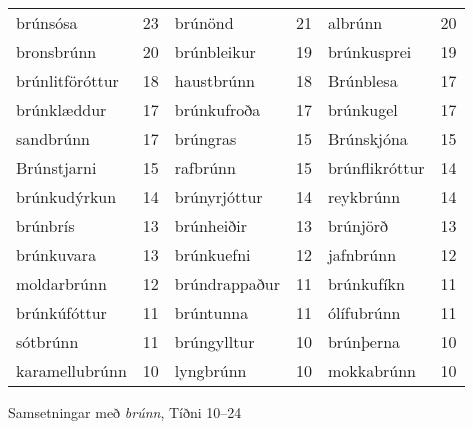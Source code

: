 \documentclass[../samsetningasafn.tex]{subfiles}
\begin{document}
\begin{wordlist}[H]
\begin{tcolorbox}

	\setlength{\extrarowheight}{3pt}
	\begin{tabular}{BlBlBl}	
		brúnsósa		& 23		& 	
		brúnönd			& 21		& 	
		albrúnn			& 20		\\ 	
		bronsbrúnn		& 20		& 	
		brúnbleikur		& 19		& 		
		brúnkusprei		& 19		\\ 	
		brúnlitföróttur	& 18		& 	
		haustbrúnn		& 18		& 	
		Brúnblesa		& 17		\\ 	
		brúnklæddur		& 17		& 	
		brúnkufroða		& 17		& 	
		brúnkugel		& 17		\\ 	
		sandbrúnn		& 17		& 	
		brúngras		& 15		& 	
		Brúnskjóna		& 15		\\ 	
		Brúnstjarni		& 15		& 	
		rafbrúnn			& 15		& 	
		brúnflikróttur	& 14		\\ 	
		brúnkudýrkun	& 14		& 	
		brúnyrjóttur		& 14		& 	
		reykbrúnn		& 14		\\ 	
		brúnbrís			& 13		& 	
		brúnheiðir		& 13		& 	
		brúnjörð			& 13		\\ 	
		brúnkuvara		& 13		& 
		brúnkuefni		& 12		& 	
		jafnbrúnn		& 12		\\ 		
		moldarbrúnn		& 12		& 	
		brúndrappaður	& 11		& 	
		brúnkufíkn		& 11		\\ 	
		brúnkúfóttur		& 11		& 	
		brúntunna		& 11		& 	
		ólífubrúnn		& 11		\\ 	
		sótbrúnn		& 11		& 	
		brúngylltur		& 10		& 	
		brúnþerna		& 10		\\ 		
		karamellubrúnn	& 10		& 	
		lyngbrúnn		& 10		& 	
		mokkabrúnn		& 10				
	\end{tabular}

\end{tcolorbox}
	\caption{Samsetningar með \textit{brúnn}, Tíðni 10--24}
	\label{listi:brunt.10}
\end{wordlist}
\end{document}
